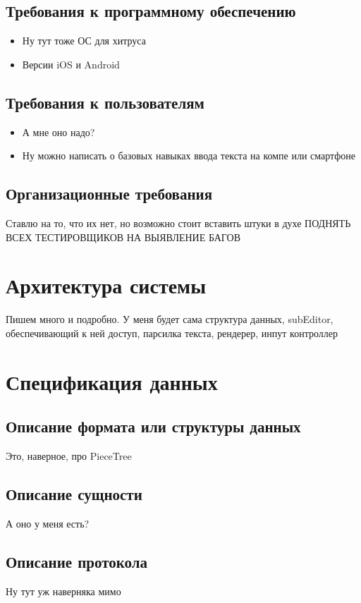 \documentclass{fefu}
\begin{document}
	\subsection{Требования к программному обеспечению}
	\begin{itemize}
		\item Ну тут тоже ОС для хитруса
		\item Версии iOS и Android
	\end{itemize}
	\subsection{Требования к пользователям}
	\begin{itemize}
		\item А мне оно надо?
		\item Ну можно написать о базовых навыках ввода текста на компе или смартфоне
	\end{itemize}
	\subsection{Организационные требования}
	\par Ставлю на то, что их нет, но возможно стоит вставить штуки в духе ПОДНЯТЬ ВСЕХ ТЕСТИРОВЩИКОВ НА ВЫЯВЛЕНИЕ БАГОВ
	
	\section{Архитектура системы}
	\par Пишем много и подробно. У меня будет сама структура данных, subEditor, обеспечивающий к ней доступ, парсилка текста, рендерер, инпут контроллер
	
	\section{Спецификация данных}
	\subsection{Описание формата или структуры данных}
	\par Это, наверное, про PieceTree
	\subsection{Описание сущности}
	\par А оно у меня есть?
	\subsection{Описание протокола}
	\par Ну тут уж наверняка мимо
	
\end{document}
